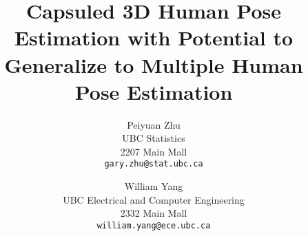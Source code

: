 \documentclass[10pt,twocolumn,letterpaper]{article}
\begin{document}
\title{Capsuled 3D Human Pose Estimation with Potential to Generalize to Multiple Human Pose Estimation}

\author{Peiyuan Zhu\\
UBC Statistics\\
2207 Main Mall\\
{\tt\small gary.zhu@stat.ubc.ca}
\and
William Yang\\
UBC Electrical and Computer Engineering\\
2332 Main Mall\\
{\tt\small william.yang@ece.ubc.ca}
}

\maketitle









{
	
	
}
\end{document}
